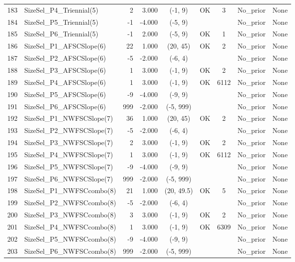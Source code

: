 \documentclass[12pt,]{article}
\begin{document}
\begin{landscape}
\begin{longtable}{rlrrcccll}
  183 & SizeSel\_P4\_Triennial(5) & 2 & 3.000 & (-1, 9) & OK & 3 & No\_prior & None \\ 
  184 & SizeSel\_P5\_Triennial(5) & -1 & -4.000 & (-5, 9) &  &  & No\_prior & None \\ 
  185 & SizeSel\_P6\_Triennial(5) & -1 & 2.000 & (-5, 9) & OK & 1 & No\_prior & None \\ 
  186 & SizeSel\_P1\_AFSCSlope(6) & 22 & 1.000 & (20, 45) & OK & 2 & No\_prior & None \\ 
  187 & SizeSel\_P2\_AFSCSlope(6) & -5 & -2.000 & (-6, 4) &  &  & No\_prior & None \\ 
  188 & SizeSel\_P3\_AFSCSlope(6) & 1 & 3.000 & (-1, 9) & OK & 2 & No\_prior & None \\ 
  189 & SizeSel\_P4\_AFSCSlope(6) & 1 & 3.000 & (-1, 9) & OK & 6112 & No\_prior & None \\ 
  190 & SizeSel\_P5\_AFSCSlope(6) & -9 & -4.000 & (-9, 9) &  &  & No\_prior & None \\ 
  191 & SizeSel\_P6\_AFSCSlope(6) & 999 & -2.000 & (-5, 999) &  &  & No\_prior & None \\ 
  192 & SizeSel\_P1\_NWFSCSlope(7) & 36 & 1.000 & (20, 45) & OK & 2 & No\_prior & None \\ 
  193 & SizeSel\_P2\_NWFSCSlope(7) & -5 & -2.000 & (-6, 4) &  &  & No\_prior & None \\ 
  194 & SizeSel\_P3\_NWFSCSlope(7) & 2 & 3.000 & (-1, 9) & OK & 2 & No\_prior & None \\ 
  195 & SizeSel\_P4\_NWFSCSlope(7) & 1 & 3.000 & (-1, 9) & OK & 6112 & No\_prior & None \\ 
  196 & SizeSel\_P5\_NWFSCSlope(7) & -9 & -4.000 & (-9, 9) &  &  & No\_prior & None \\ 
  197 & SizeSel\_P6\_NWFSCSlope(7) & 999 & -2.000 & (-5, 999) &  &  & No\_prior & None \\ 
  198 & SizeSel\_P1\_NWFSCcombo(8) & 21 & 1.000 & (20, 49.5) & OK & 5 & No\_prior & None \\ 
  199 & SizeSel\_P2\_NWFSCcombo(8) & -5 & -2.000 & (-6, 4) &  &  & No\_prior & None \\ 
  200 & SizeSel\_P3\_NWFSCcombo(8) & 3 & 3.000 & (-1, 9) & OK & 2 & No\_prior & None \\ 
  201 & SizeSel\_P4\_NWFSCcombo(8) & 1 & 3.000 & (-1, 9) & OK & 6309 & No\_prior & None \\ 
  202 & SizeSel\_P5\_NWFSCcombo(8) & -9 & -4.000 & (-9, 9) &  &  & No\_prior & None \\ 
  203 & SizeSel\_P6\_NWFSCcombo(8) & 999 & -2.000 & (-5, 999) &  &  & No\_prior & None \\ 

\end{longtable}
\end{landscape}
\end{document}
